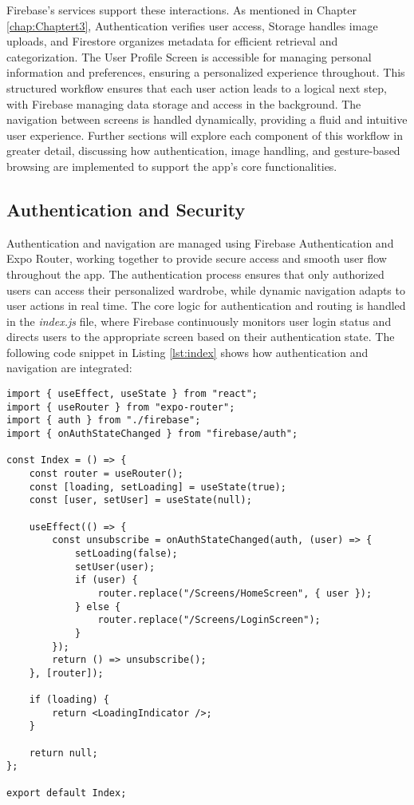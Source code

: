 Firebase’s services support these interactions. As mentioned in Chapter \ref{chap:Chaptert3},  Authentication verifies user access, Storage handles image uploads, and Firestore organizes metadata for efficient retrieval and categorization. The User Profile Screen is accessible for managing personal information and preferences, ensuring a personalized experience throughout.
This structured workflow ensures that each user action leads to a logical next step, with Firebase managing data storage and access in the background. The navigation between screens is handled dynamically, providing a fluid and intuitive user experience. Further sections will explore each component of this workflow in greater detail, discussing how authentication, image handling, and gesture-based browsing are implemented to support the app’s core functionalities.

\subsection{Authentication and Security}
Authentication and navigation are managed using Firebase Authentication and Expo Router, working together to provide secure access and smooth user flow throughout the app. The authentication process ensures that only authorized users can access their personalized wardrobe, while dynamic navigation adapts to user actions in real time.
The core logic for authentication and routing is handled in the \textit{index.js} file, where Firebase continuously monitors user login status and directs users to the appropriate screen based on their authentication state. 
The following code snippet in Listing \ref{lst:index} shows how authentication and navigation are integrated:
\begin{lstlisting}[caption={Authentication and routing in \texttt{index.js}}, label={lst:index}]
import { useEffect, useState } from "react";
import { useRouter } from "expo-router";
import { auth } from "./firebase";
import { onAuthStateChanged } from "firebase/auth";

const Index = () => {
    const router = useRouter();
    const [loading, setLoading] = useState(true);
    const [user, setUser] = useState(null);

    useEffect(() => {
        const unsubscribe = onAuthStateChanged(auth, (user) => {
            setLoading(false);
            setUser(user);
            if (user) {
                router.replace("/Screens/HomeScreen", { user });
            } else {
                router.replace("/Screens/LoginScreen");
            }
        });
        return () => unsubscribe();
    }, [router]);

    if (loading) {
        return <LoadingIndicator />;
    }

    return null;
};

export default Index;
\end{lstlisting}

